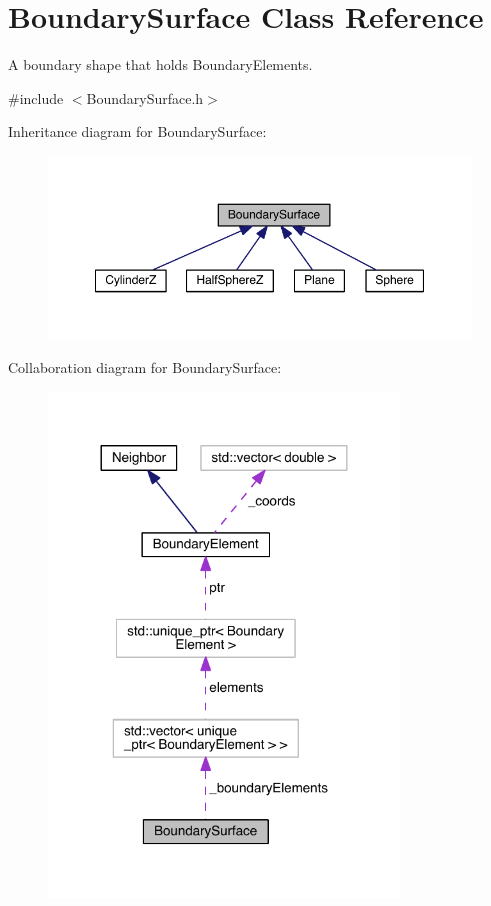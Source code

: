 \hypertarget{classBoundarySurface}{\section{Boundary\+Surface Class Reference}
\label{classBoundarySurface}
}


A boundary shape that holds Boundary\+Elements.  




{\ttfamily \#include $<$Boundary\+Surface.\+h$>$}



Inheritance diagram for Boundary\+Surface\+:\nopagebreak
\begin{figure}[H]
\begin{center}
\leavevmode
\includegraphics[width=350pt]{classBoundarySurface__inherit__graph}
\end{center}
\end{figure}


Collaboration diagram for Boundary\+Surface\+:\nopagebreak
\begin{figure}[H]
\begin{center}
\leavevmode
\includegraphics[width=264pt]{classBoundarySurface__coll__graph}
\end{center}
\end{figure}
